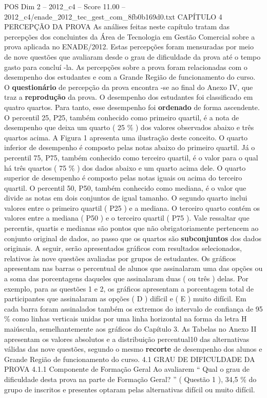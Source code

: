 \begin{textsample}{POS Dim 2 – 2012\_c4 – Score 11.00 – 2012\_c4/enade\_2012\_tec\_gest\_com\_8fb0b169d0.txt}  \label{ex:f2_pos_105}
CAPÍTULO 4 PERCEPÇÃO DA PROVA As análises feitas neste capítulo tratam das percepções dos concluintes da Área de Tecnologia em Gestão Comercial sobre a prova aplicada no ENADE/2012.
Estas percepções foram mensuradas por meio de nove questões que avaliaram desde o grau de dificuldade da prova até o tempo gasto para concluí -la.
As percepções sobre a prova foram relacionadas com o desempenho dos estudantes e com a Grande Região de funcionamento do curso.
O \textbf{questionário} de percepção da prova encontra -se ao final do Anexo IV, que traz a \textbf{reprodução} da prova.
O desempenho dos estudantes foi classificado em quatro quartos.
Para tanto, esse desempenho foi \textbf{ordenado} de forma ascendente.
O percentil 25, P25, também conhecido como primeiro quartil, é a nota de desempenho que deixa um quarto ( 25 \% ) dos valores observados abaixo e três quartos acima.
A Figura 1 apresenta uma ilustração deste conceito.
O quarto inferior de desempenho é composto pelas notas abaixo do primeiro quartil.
Já o percentil 75, P75, também conhecido como terceiro quartil, é o valor para o qual há três quartos ( 75 \% ) dos dados abaixo e um quarto acima dele.
O quarto superior de desempenho é composto pelas notas iguais ou acima do terceiro quartil.
O percentil 50, P50, também conhecido como mediana, é o valor que divide as notas em dois conjuntos de igual tamanho.
O segundo quarto inclui valores entre o primeiro quartil ( P25 ) e a mediana.
O terceiro quarto contém os valores entre a mediana ( P50 ) e o terceiro quartil ( P75 ).
Vale ressaltar que percentis, quartis e medianas são pontos que não obrigatoriamente pertencem ao conjunto original de dados, ao passo que os quartos são \textbf{subconjuntos} dos dados originais.
A seguir, serão apresentados gráficos com resultados selecionados, relativos às nove questões avaliadas por grupos de estudantes.
Os gráficos apresentam nas barras o percentual de alunos que assinalaram uma das opções ou a soma das porcentagens daqueles que assinalaram duas ( ou três ) delas.
Por exemplo, para as questões 1 e 2, os gráficos apresentam a porcentagem total de participantes que assinalaram as opções ( D ) difícil e ( E ) muito difícil.
Em cada barra foram assinalados também os extremos do intervalo de confiança de 95 \% como linhas verticais unidas por uma linha horizontal na forma da letra H maiúscula, semelhantemente aos gráficos do Capítulo 3.
As Tabelas no Anexo II apresentam os valores absolutos e a distribuição percentual10 das alternativas válidas das nove questões, segundo o mesmo \textbf{recorte} de desempenho dos alunos e Grande Região de funcionamento do curso. 4.1 GRAU DE DIFICULDADE DA PROVA 4.1.1 Componente de Formação Geral Ao avaliarem “ Qual o grau de dificuldade desta prova na parte de Formação Geral? ” ( Questão 1 ), 34,5 \% do grupo de inscritos e presentes optaram pelas alternativas difícil ou muito difícil.

\end{textsample}
